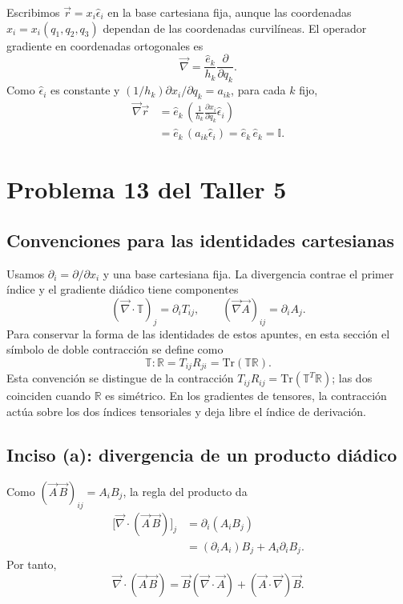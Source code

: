 Escribimos $\vec r=x_i\hat\epsilon_i$ en la base cartesiana fija, aunque las coordenadas $x_i=x_i(q_1,q_2,q_3)$ dependan de las coordenadas curvilíneas. El operador gradiente en coordenadas ortogonales es
\[
\vec\nabla=\frac{\hat e_k}{h_k}\frac{\partial}{\partial q_k}.
\]
Como $\hat\epsilon_i$ es constante y $(1/h_k)\partial x_i/\partial q_k=a_{ik}$, para cada $k$ fijo,
\[
\begin{aligned}
\vec\nabla\vec r
&=\hat e_k\,
\left(\frac{1}{h_k}\frac{\partial x_i}{\partial q_k}\hat\epsilon_i\right)\\
&=\hat e_k\,(a_{ik}\hat\epsilon_i)
=\hat e_k\,\hat e_k
=\boxed{\mathbb I}.
\end{aligned}
\]

\section{Problema 13 del Taller 5}

\subsection{Convenciones para las identidades cartesianas}

Usamos $\partial_i=\partial/\partial x_i$ y una base cartesiana fija. La divergencia contrae el primer índice y el gradiente diádico tiene componentes
\[
(\vec\nabla\cdot\mathbb T)_j=\partial_iT_{ij},
\qquad (\vec\nabla\vec A)_{ij}=\partial_iA_j.
\]
Para conservar la forma de las identidades de estos apuntes, en esta sección el símbolo de doble contracción se define como
\[
\mathbb T:\mathbb R=T_{ij}R_{ji}=\mathrm{Tr}(\mathbb T\mathbb R).
\]
Esta convención se distingue de la contracción $T_{ij}R_{ij}=\mathrm{Tr}(\mathbb T^T\mathbb R)$; las dos coinciden cuando $\mathbb R$ es simétrico. En los gradientes de tensores, la contracción actúa sobre los dos índices tensoriales y deja libre el índice de derivación.

\subsection*{Inciso (a): divergencia de un producto diádico}

Como $(\vec A\,\vec B)_{ij}=A_iB_j$, la regla del producto da
\[
\begin{aligned}
\bigl[\vec\nabla\cdot(\vec A\,\vec B)\bigr]_j
&=\partial_i(A_iB_j)\\
&=(\partial_iA_i)B_j+A_i\partial_iB_j.
\end{aligned}
\]
Por tanto,
\[
\boxed{\vec\nabla\cdot(\vec A\,\vec B)
=\vec B(\vec\nabla\cdot\vec A)+(\vec A\cdot\vec\nabla)\vec B}.
\]

